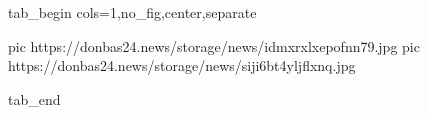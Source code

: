  
 
 
 
 

\ifcmt
  tab_begin cols=1,no_fig,center,separate

     pic https://donbas24.news/storage/news/idmxrxlxepofnn79.jpg
		 pic https://donbas24.news/storage/news/siji6bt4yljflxnq.jpg

  tab_end
\fi
